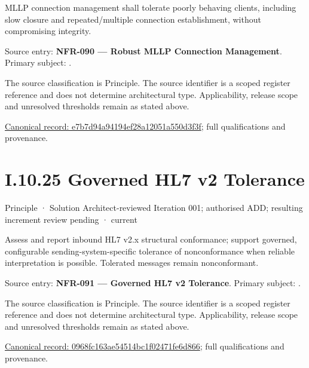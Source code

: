 MLLP connection management shall tolerate poorly behaving clients, including slow closure and repeated/multiple connection establishment, without compromising integrity.



Source entry: \textbf{NFR-090 — Robust MLLP Connection Management}. Primary subject: \texttt{}.



The source classification is Principle. The source identifier is a scoped register reference and does not determine architectural type. Applicability, release scope and unresolved thresholds remain as stated above.


{\footnotesize \href{../../../../../../../../continuum/motivation/principle/e7b7d94a94194ef28a12051a550d3f3f.md}{Canonical record: e7b7d94a94194ef28a12051a550d3f3f}; full qualifications and provenance.}\par
\section*{I.10.25 Governed HL7 v2 Tolerance}
\label{navigation:I.10.25}

\label{element:0968fc163ae54514bc1f02471fe6d866}
{\small Principle · Solution Architect-reviewed Iteration 001; authorised ADD; resulting increment review pending · current}\par

Assess and report inbound HL7 v2.x structural conformance; support governed, configurable sending-system-specific tolerance of nonconformance when reliable interpretation is possible. Tolerated messages remain nonconformant.



Source entry: \textbf{NFR-091 — Governed HL7 v2 Tolerance}. Primary subject: \texttt{}.



The source classification is Principle. The source identifier is a scoped register reference and does not determine architectural type. Applicability, release scope and unresolved thresholds remain as stated above.


{\footnotesize \href{../../../../../../../../continuum/motivation/principle/0968fc163ae54514bc1f02471fe6d866.md}{Canonical record: 0968fc163ae54514bc1f02471fe6d866}; full qualifications and provenance.}\par
